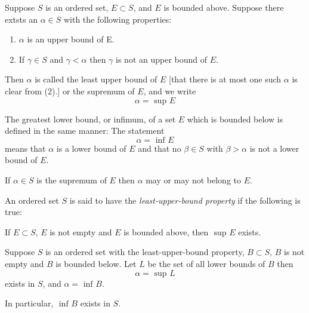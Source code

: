 \begin{defn}
	\label{supremum}
	Suppose $S$ is an ordered set, $E \subset S$, and $E$ is bounded above.
	Suppose there extsts an $\alpha \in S$ with the following properties:
	\begin{enumerate}
		\item $\alpha$ is an upper bound of E.
		\item If $\gamma \in S$ and $\gamma < \alpha$ then $\gamma$ is not an upper bound of $E$.
	\end{enumerate}
	Then $\alpha$ is called the least upper bound of $E$
	[that there is at most one such $\alpha$ is clear from (2).]
	or the supremum of $E$, and we write $$ \alpha = \text{ sup } E $$

	The greatest lower bound, or infimum, of a set $E$ which is bounded below is defined in the same manner:
	The statement $$ \alpha = \text{ inf } E $$ means that $\alpha$ is a lower bound of $E$
	and that no $\beta \in S$ with $\beta > \alpha$ is not a lower bound of $E$.
\end{defn}

\begin{rem}
	If $\alpha \in S$ is the supremum of $E$ then $\alpha$ may or may not belong to $E$.
\end{rem}

\begin{defn}
	An ordered set $S$ is said to have the {\it least-upper-bound property} if the following is true:

	If $E \subset S$, $E$ is not empty and $E$ is bounded above, then $\text{ sup } E$ exists.
\end{defn}

\pagebreak

\begin{thm}
	Suppose $S$ is an ordered set with the least-upper-bound property,
	$B \subset S$, $B$ is not empty and $B$ is bounded below.
	Let $L$ be the set of all lower bounds of $B$ then $$ \alpha = \text{ sup } L $$
	exists in $S$, and $\alpha = \text{ inf } B$.

	In particular, $\text{ inf } B$ exists in $S$.
\end{thm}

